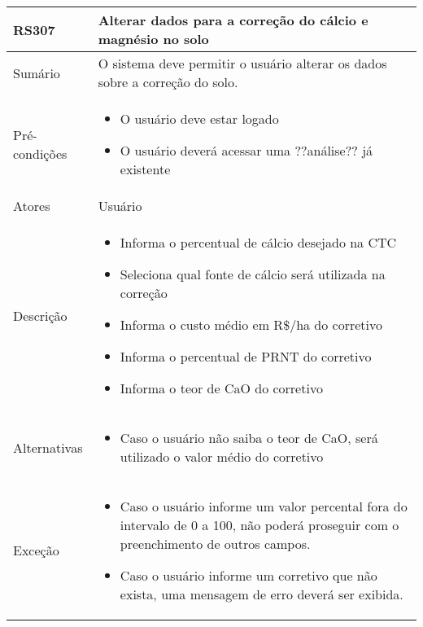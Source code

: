 \begin{quadro}[!htb]
    \begin{tabular}{|p{3cm}|p{11cm}|}
        \hline
        \textbf{RS307} & \textbf{Alterar dados para a correção do cálcio e magnésio no solo} \\
        \hline
        Sumário        & O sistema deve permitir o usuário alterar os dados sobre a correção do solo.                  \\
        \hline
        Pré-condições  & \begin{itemize}
            \item O usuário deve estar logado
            \item O usuário deverá acessar uma ??análise?? já existente 
        \end{itemize}                 \\
        \hline
        Atores         & Usuário                  \\
        \hline
        Descrição      &
        \begin{itemize}
            \item Informa o percentual de cálcio desejado na CTC
            \item Seleciona qual fonte de cálcio será utilizada na correção
            \item Informa o custo médio em R\$/ha do corretivo
            \item Informa o percentual de PRNT do corretivo
            \item Informa o teor de CaO do corretivo
        \end{itemize}                 \\
        \hline
        Alternativas   &
        \begin{itemize}
            \item Caso o usuário não saiba o teor de CaO, será utilizado o valor médio do corretivo
        \end{itemize}                 \\
        \hline
        Exceção        &
        \begin{itemize}
            \item Caso o usuário informe um valor percental fora do intervalo de 0 a 100, não poderá proseguir com o preenchimento de outros campos.
            \item Caso o usuário informe um corretivo que não exista, uma mensagem de erro deverá ser exibida.
        \end{itemize}                   \\
        \hline
    \end{tabular}
\end{quadro}

